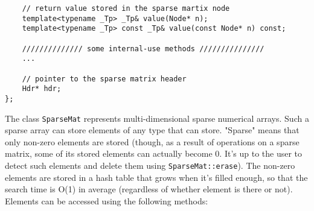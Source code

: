 \begin{lstlisting}
    // return value stored in the sparse martix node
    template<typename _Tp> _Tp& value(Node* n);
    template<typename _Tp> const _Tp& value(const Node* n) const;
    
    ////////////// some internal-use methods ///////////////
    ...

    // pointer to the sparse matrix header
    Hdr* hdr;
};
\end{lstlisting}

The class \texttt{SparseMat} represents multi-dimensional sparse numerical arrays. Such a sparse array can store elements of any type that  can store. "Sparse" means that only non-zero elements are stored (though, as a result of operations on a sparse matrix, some of its stored elements can actually become 0. It's up to the user to detect such elements and delete them using \texttt{SparseMat::erase}). The non-zero elements are stored in a hash table that grows when it's filled enough, so that the search time is O(1) in average (regardless of whether element is there or not). Elements can be accessed using the following methods:

